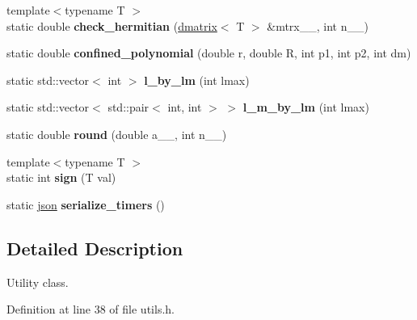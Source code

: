 \begin{DoxyCompactItemize}
\item 
\hypertarget{class_utils_a8261b53bc696bd2bd93ab04a34c23202}{}{\footnotesize template$<$typename T $>$ }\\static double {\bfseries check\+\_\+hermitian} (\hyperlink{classsddk_1_1dmatrix}{dmatrix}$<$ T $>$ \&mtrx\+\_\+\+\_\+, int n\+\_\+\+\_\+)\label{class_utils_a8261b53bc696bd2bd93ab04a34c23202}

\item 
\hypertarget{class_utils_a871e6ff5dfe1e73a771e9841b8dfc196}{}static double {\bfseries confined\+\_\+polynomial} (double r, double R, int p1, int p2, int dm)\label{class_utils_a871e6ff5dfe1e73a771e9841b8dfc196}

\item 
\hypertarget{class_utils_a0a25d39730bcb1e785e152bc96b31806}{}static std\+::vector$<$ int $>$ {\bfseries l\+\_\+by\+\_\+lm} (int lmax)\label{class_utils_a0a25d39730bcb1e785e152bc96b31806}

\item 
\hypertarget{class_utils_a3a267e3038fa81e55c48c6ff889a803e}{}static std\+::vector$<$ std\+::pair$<$ int, int $>$ $>$ {\bfseries l\+\_\+m\+\_\+by\+\_\+lm} (int lmax)\label{class_utils_a3a267e3038fa81e55c48c6ff889a803e}

\item 
\hypertarget{class_utils_ad95c1e1d6ccf5f6e7ef8dd97ddbe5d34}{}static double {\bfseries round} (double a\+\_\+\+\_\+, int n\+\_\+\+\_\+)\label{class_utils_ad95c1e1d6ccf5f6e7ef8dd97ddbe5d34}

\item 
\hypertarget{class_utils_afbcb4fc26bf47c3d9f6abdb8e7fab1ed}{}{\footnotesize template$<$typename T $>$ }\\static int {\bfseries sign} (T val)\label{class_utils_afbcb4fc26bf47c3d9f6abdb8e7fab1ed}

\item 
\hypertarget{class_utils_ad2242d3f0bb93a018620aba711349e27}{}static \hyperlink{classnlohmann_1_1basic__json}{json} {\bfseries serialize\+\_\+timers} ()\label{class_utils_ad2242d3f0bb93a018620aba711349e27}

\end{DoxyCompactItemize}


\subsection{Detailed Description}
Utility class. 

Definition at line 38 of file utils.\+h.



